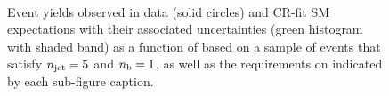 \begin{figure}[h!]
\begin{center}
    \\
    \caption{Event yields observed in data (solid circles) and CR-fit SM expectations with their associated uncertainties (green histogram with shaded band) as a function of \HTmiss based on a sample of events that satisfy $n_{\text{jet}} = 5$ and $n_{\text{b}} = 1$, as well as the requirements on \scalht indicated by each sub-figure caption. }
    \label{fig:mhtdim_eq5j_eq1b}
  \end{center}
\end{figure}

